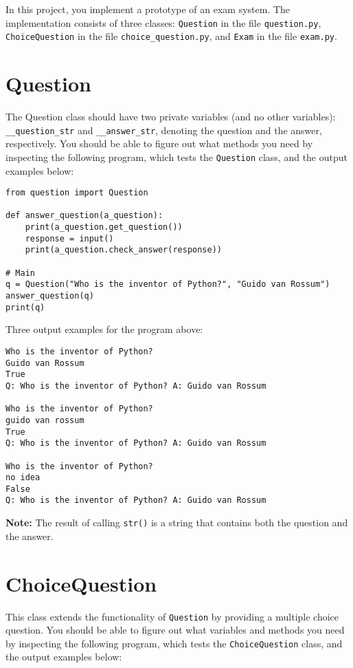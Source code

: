 
In this project, you implement a prototype of an exam system. 
The implementation consists of three classes: \texttt{Question} in the file \texttt{question.py}, \texttt{ChoiceQuestion} in the file \texttt{choice\_question.py}, and \texttt{Exam} in the file \texttt{exam.py}.

\section*{Question}
The Question class should have two private variables (and no other variables):
\texttt{\_\_question\_str} and \texttt{\_\_answer\_str}, denoting the question and the answer, respectively.
You should be able to figure out what methods you need by inspecting the following program, which tests the \texttt{Question} class, and the output examples below:

\begin{verbatim}
from question import Question

def answer_question(a_question):
    print(a_question.get_question())
    response = input()
    print(a_question.check_answer(response))

# Main
q = Question("Who is the inventor of Python?", "Guido van Rossum")
answer_question(q)
print(q)
\end{verbatim}

\noindent
Three output examples for the program above:

\begin{verbatim}
Who is the inventor of Python?
Guido van Rossum
True
Q: Who is the inventor of Python? A: Guido van Rossum

Who is the inventor of Python?
guido van rossum
True
Q: Who is the inventor of Python? A: Guido van Rossum

Who is the inventor of Python?
no idea
False
Q: Who is the inventor of Python? A: Guido van Rossum
\end{verbatim}

\noindent
\textbf{Note:} The result of calling \texttt{str()} is a string that contains both the question and the answer.

\section*{ChoiceQuestion}
This class extends the functionality of \texttt{Question} by providing a multiple choice question.
You should be able to figure out what variables and methods you need by inspecting the following program, which tests the \texttt{ChoiceQuestion} class, and the output examples below:

